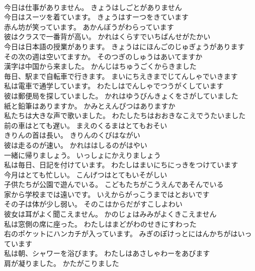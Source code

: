 \documentclass[8pt]{extreport}
\begin{document}
\begin{CJK}{UTF8}{min}
\\	今日は仕事がありません。	きょうはしごとがありません 
\\	今日はスーツを着ています。	きょうはすーつをきています 
\\	赤ん坊が笑っています。	あかんぼうがわらっています 
\\	彼はクラスで一番背が高い。	かれはくらすでいちばんせがたかい 
\\	今日は日本語の授業があります。	きょうはにほんごのじゅぎょうがあります 
\\	その次の週は空いてますか。	そのつぎのしゅうはあいてますか 
\\	漢字は中国から来ました。	かんじはちゅうごくからきました 
\\	毎日、駅まで自転車で行きます。	まいにちえきまでじてんしゃでいきます 
\\	私は電車で通学しています。	わたしはでんしゃでつうがくしています 
\\	彼は郵便局を探していました。	かれはゆうびんきょくをさがしていました 
\\	紙と鉛筆はありますか。	かみとえんぴつはありますか 
\\	私たちは大きな声で歌いました。	わたしたちはおおきなこえでうたいました 
\\	前の車はとても遅い。	まえのくるまはとてもおそい 
\\	きりんの首は長い。	きりんのくびはながい 
\\	彼は走るのが速い。	かれははしるのがはやい 
\\	一緒に帰りましょう。	いっしょにかえりましょう 
\\	私は毎日、日記を付けています。	わたしはまいにちにっきをつけています 
\\	今月はとても忙しい。	こんげつはとてもいそがしい 
\\	子供たちが公園で遊んでいる。	こどもたちがこうえんであそんでいる 
\\	家から学校までは遠いです。	いえからがっこうまではとおいです 
\\	その子は体が少し弱い。	そのこはからだがすこしよわい 
\\	彼女は耳がよく聞こえません。	かのじょはみみがよくきこえません 
\\	私は窓側の席に座った。	わたしはまどがわのせきにすわった 
\\	右のポケットにハンカチが入っています。	みぎのぽけっとにはんかちがはいっています 
\\	私は朝、シャワーを浴びます。	わたしはあさしゃわーをあびます 
\\	肩が凝りました。	かたがこりました 

\end{CJK}
\end{document}
